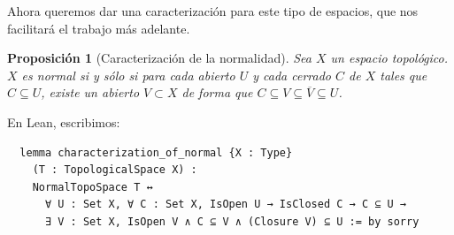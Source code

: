 \documentclass{article}
\newtheorem{proposition}{Proposición}[section]
\begin{document}
Ahora queremos dar una caracterización para este tipo de espacios, que nos facilitará el trabajo más adelante.

\begin{proposition}[Caracterización de la normalidad]
  Sea $X$ un espacio topológico. $X$ es normal si y sólo si para cada abierto $U$ y cada cerrado $C$ de $X$ tales que $C \subseteq U$, existe un abierto $V \subset X$ de forma que $C \subseteq V \subseteq \overline{V} \subseteq U$.
\end{proposition}

En Lean, escribimos:

\begin{lstlisting}
  lemma characterization_of_normal {X : Type}
    (T : TopologicalSpace X) :
    NormalTopoSpace T ↔
      ∀ U : Set X, ∀ C : Set X, IsOpen U → IsClosed C → C ⊆ U →
      ∃ V : Set X, IsOpen V ∧ C ⊆ V ∧ (Closure V) ⊆ U := by sorry
\end{lstlisting}
\end{document}
